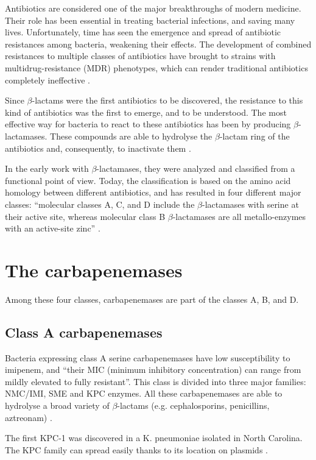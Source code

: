 \documentclass[11pt]{report}
\begin{document}
Antibiotics are considered one of the major breakthroughs of modern medicine. Their role has been essential in treating bacterial infections, and saving many lives. Unfortunately, time has seen the emergence and spread of antibiotic resistances among bacteria, weakening their effects. The development of combined resistances to multiple classes of antibiotics have brought to strains with multidrug-resistance (MDR) phenotypes, which can render traditional antibiotics completely ineffective \cite{Rossolini2014}.


Since $\beta$-lactams were the first antibiotics to be discovered, the resistance to this kind of antibiotics was the first to emerge, and to be understood. The most effective way for bacteria to react to these antibiotics has been by producing $\beta$-lactamases. These compounds are able to hydrolyse the $\beta$-lactam ring of the antibiotics and, consequently, to inactivate them \cite{KONG2010}.


In the early work with $\beta$-lactamases, they were analyzed and classified from a functional point of view. Today, the classification is based on the amino acid homology between different antibiotics, and has resulted in four different major classes: “molecular classes A, C, and D include the $\beta$-lactamases with serine at their active site, whereas molecular class B $\beta$-lactamases are all metallo-enzymes with an active-site zinc” \cite{Queenan2007}.


\section{The carbapenemases}
Among these four classes, carbapenemases are part of the classes A, B, and D.

\subsection{Class A carbapenemases}
Bacteria expressing class A serine carbapenemases have low susceptibility to imipenem, and “their MIC (minimum inhibitory concentration) can range from mildly elevated to fully resistant”. This class is divided into three major families: NMC/IMI, SME and KPC enzymes.
All these carbapenemases are able to hydrolyse a broad variety of $\beta$-lactams (e.g. cephalosporins, penicillins, aztreonam) \cite{KONG2010} \cite{Queenan2007}.


The first KPC-1 was discovered in a K. pneumoniae isolated  in North Carolina. The KPC family can spread easily thanks to its location on plasmids \cite{Queenan2007}.
\end{document}
